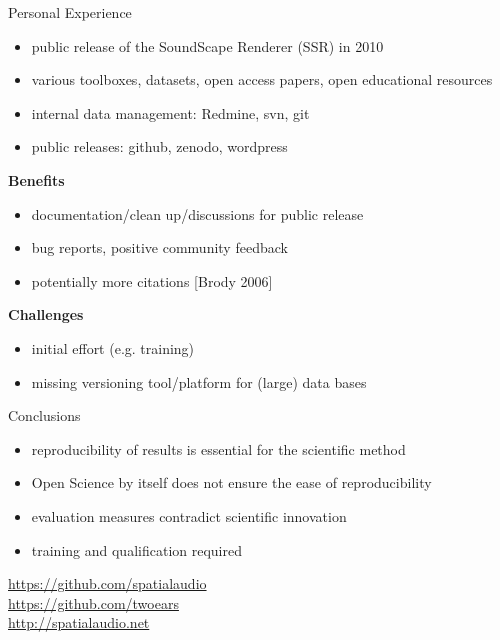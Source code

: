 \documentclass{intbeamer}
\begin{document}
\begin{frame}{Personal Experience}

\begin{itemize}
\item public release of the SoundScape Renderer (SSR) in 2010
\item various toolboxes, datasets, open access papers, open educational resources
\item internal data management: Redmine, svn, git
\item public releases: github, zenodo, wordpress
\end{itemize}

\vfill

\textbf{Benefits}
\begin{itemize}
\item documentation/clean up/discussions for public release
\item bug reports, positive community feedback
\item potentially more citations {\tiny [Brody 2006]}
\end{itemize}

\vfill

\textbf{Challenges}
\begin{itemize}
\item initial effort (e.g. training)
\item missing versioning tool/platform for (large) data bases
\end{itemize}

\end{frame}


\begin{frame}{Conclusions}

\begin{itemize}
\item reproducibility of results is essential for the scientific method
\item Open Science by itself does not ensure the ease of reproducibility
\item evaluation measures contradict scientific innovation
\item training and qualification required
\end{itemize}

\vfill

{\large
\url{https://github.com/spatialaudio}\\[1ex]
\url{https://github.com/twoears}\\[1ex]
\url{http://spatialaudio.net}
}

\end{frame}
\end{document}
